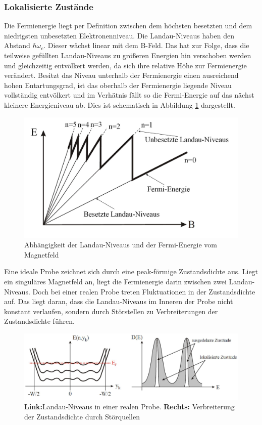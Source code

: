 \subsubsection{Lokalisierte Zustände}
\label{sec:lokalisierte Zust}

Die Fermienergie liegt per Definition zwischen dem höchsten besetzten und dem niedrigsten unbesetzten Elektronenniveau. Die Landau-Niveaus haben den Abstand $\hbar\omega_c$. Dieser wächst linear mit dem B-Feld. Das hat zur Folge, dass die teilweise gefüllten Landau-Niveaus zu größeren Energien hin verschoben werden und gleichzeitig entvölkert werden, da sich ihre relative Höhe zur Fermienergie verändert. Besitzt das Niveau unterhalb der Fermienergie einen ausreichend hohen Entartungsgrad, ist das oberhalb der Fermienergie liegende Niveau vollständig entvölkert und im Verhätnis fällt so die Fermi-Energie auf das nächst kleinere Energieniveau ab. Dies ist schematisch in Abbildung \ref{fig:Lokalisierte_Zust_Anleitungsheft} dargestellt.

\begin{figure}[h]
\centering
\includegraphics[width=0.7\linewidth]{images/Anleitungsheft/Lokalisierte_Zust_Anleitungsheft}
\caption[Fermi-Energie lokalisierter Zustände]{Abhängigkeit der Landau-Niveaus und der Fermi-Energie vom Magnetfeld}
\label{fig:Lokalisierte_Zust_Anleitungsheft}
\end{figure}

Eine ideale Probe zeichnet sich durch eine peak-förmige Zustandsdichte aus. Liegt ein singuläres Magnetfeld an, liegt die Fermienergie darin zwischen zwei Landau-Niveaus. Doch bei einer realen Probe treten Fluktuationen in der Zustandsdichte auf. Das liegt daran, dass die Landau-Niveaus im Inneren der Probe nicht konstant verlaufen, sondern durch Störstellen zu Verbreiterungen der Zustandsdichte führen.

\begin{figure}[h]
\centering
\includegraphics[width=0.7\linewidth]{images/Anleitungsheft/fermi_landau_Anleitungsheft}
\caption[Struktur von Landau-Niveaus in realer Probe]{\textbf{Link:}Landau-Niveaus in einer realen Probe. \textbf{Rechts:} Verbreiterung der Zustandsdichte durch Störquellen}
\label{fig:fermi_landau_Anleitungsheft}
\end{figure}

